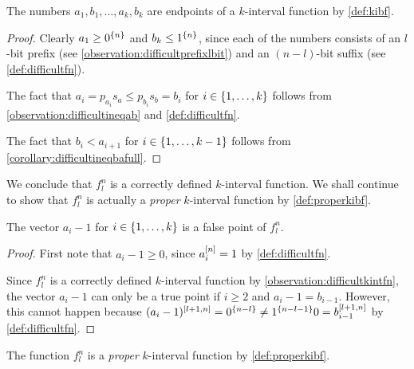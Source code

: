 
\begin{observation}
\label{observation:difficultkintfn}
The numbers $a_1, b_1, \ldots, a_k, b_k$
are endpoints of a $k$-interval function
by \cref{def:kibf}.
\end{observation}

\begin{proof}
Clearly $a_1 \geq 0^{\{n\}}$ and $b_k \leq 1^{\{n\}}$,
since each of the numbers consists of an $l$-bit prefix
(see \cref{observation:difficultprefixlbit})
and an $(n-l)$-bit suffix
(see \cref{def:difficultfn}).

The fact that $a_i = p_{a_i} s_a \leq p_{b_i} s_b = b_i$
for $i \in \{1, \ldots, k\}$ follows from
\cref{observation:difficultineqab}
and \cref{def:difficultfn}.

The fact that
$b_i < a_{i+1}$ for $i \in \{1, \ldots, k-1\}$
follows from \cref{corollary:difficultineqbafull}.
\end{proof}

We conclude that $f_l^n$
is a correctly defined $k$-interval function.
We shall continue to show that $f_l^n$ is actually
a \emph{proper} $k$-interval function
by \cref{def:properkibf}.

\begin{observation}
\label{observation:difficultafp}
The vector $a_i - 1$ for $i \in \{1, \ldots, k\}$
is a false point of $f_l^n$.
\end{observation}

\begin{proof}
First note that $a_i - 1 \geq 0$,
since $a_i^{[n]} = 1$ by \cref{def:difficultfn}.

Since $f_l^n$ is a correctly defined
$k$-interval function
by \cref{observation:difficultkintfn},
the vector $a_i - 1$
can only be a true point if
$i \geq 2$
and $a_i - 1 = b_{i-1}$.
However, this cannot happen because
$(a_i - 1)^{[l+1, n]} = 0^{\{n-l\}} \neq 1^{\{n-l-1\}} 0 = b_{i-1}^{[l+1, n]}$
by \cref{def:difficultfn}.
\end{proof}

\begin{corollary}
\label{corollary:difficultproper}
The function $f_l^n$
is a \emph{proper} $k$-interval function
by \cref{def:properkibf}.
\end{corollary}

